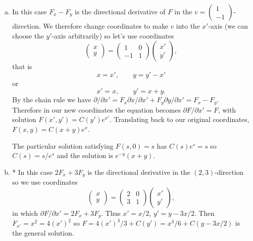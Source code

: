 \documentclass[12pt]{article}
\begin{document}
\begin{answer}
\begin{enumerate}[(a)]
\item In this case $F_x-F_y$ is the directional derivative of $F$ in the $v=\left(\begin{array}{c}1\\ -1\end{array}\right)$-direction. We therefore change coordinates to make $v$ into the $x'$-axis (we can choose the $y'$-axis arbitrarily) so let's use coordinates
\[\left(\begin{array}{c}
x\\ y
\end{array}\right)=\left(\begin{array}{cc}1 & 0\\ -1 & 1\end{array}\right)\left(\begin{array}{c}x' \\ y'\end{array}\right),\]
that is
\[x=x',\qquad y=y'-x'\]
or
\[x'=x,\qquad y'=x+y.\]
By the chain rule we have $\partial/\partial x'=F_x\partial x/\partial x'+F_y\partial y/\partial x'=F_x-F_y$. Therefore in our new coordinates the equation becomes $\partial F/\partial x'=F$, with solution $F(x',y')=C(y')e^{x'}$. Translating back to our original coordinates, $F(x,y)=C(x+y)e^x$.

The particular solution satisfying $F(s,0)=s$ has $C(s)e^s=s$ so $C(s)=s/e^s$ and the solution is $e^{-y}(x+y)$.
\item * In this case $2F_x+3F_y$ is the directional derivative in the $(2,3)$-direction so we use coordinates
\[\left(\begin{array}{c}
x\\ y
\end{array}\right)=\left(\begin{array}{cc}2 & 0\\ 3 & 1\end{array}\right)\left(\begin{array}{c}x' \\ y'\end{array}\right),\]
in which $\partial F/\partial x'=2F_x+3F_y$. Thus $x'=x/2$, $y'=y-3x/2$. Then $F_{x'}=x^2=4(x')^2$ so $F=4(x')^3/3+C(y')=x^3/6+C(y-3x/2)$ is the general solution.


\end{enumerate}
\end{answer}
\end{document}
